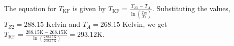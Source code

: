 The equation for \( T_{\text{KF}} \) is given by \( T_{\text{KF}} = \frac{T_{Z2} - T_A}{\ln \left( \frac{T_{Z2}}{T_A} \right)} \). Substituting the values, \( T_{Z2} = 288.15 \) Kelvin and \( T_A = 268.15 \) Kelvin, we get \( T_{\text{KF}} = \frac{288.15 \text{K} - 268.15 \text{K}}{\ln \left( \frac{288.15 \text{K}}{268.15 \text{K}} \right)} = 293.12 \text{K} \).